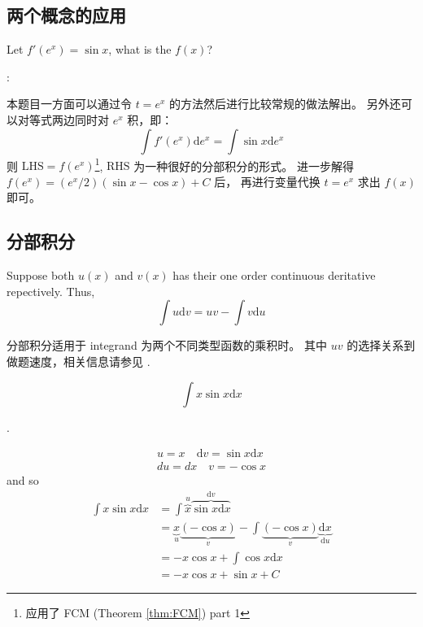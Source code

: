 \subsection{两个概念的应用}

\begin{example}
    Let $f'(e^x) = \sin x$, what is the $f(x)$?

    \cite[page 101, example 1]{we}:

    本题目一方面可以通过令 $t = e^x$ 的方法然后进行比较常规的做法解出。
    另外还可以对等式两边同时对 $e^x$ 积，即：
    \[
        \int f'(e^x) \mbox{d} e^x = \int \sin x \mbox{d} e^x
    \]
    则 $\mbox{LHS} = f(e^x)$\footnote{应用了 FCM (Theorem \ref{thm:FCM}) part 1}, 
    $\mbox{RHS}$ 为一种很好的分部积分的形式。
    进一步解得 $f(e^x) = (e^x/2) (\sin x - \cos x) + C$ 后，
    再进行变量代换 $t = e^x$ 求出 $f(x)$ 即可。
\end{example}

\subsection{分部积分}\label{part-integral}

\begin{definition}
    Suppose both $u(x)$ and $v(x)$ has their one order continuous deritative repectively.
    Thus, 
    \[
        \int u \mbox{d} v = uv - \int v \mbox{d} u
    \]
\end{definition}

分部积分适用于 integrand 为两个不同类型函数的乘积时。
其中 $uv$ 的选择关系到做题速度，相关信息请参见 \cite[page 95, pdf 106]{we}.

\begin{example}
    \[
        \int x \sin x \mathrm dx
    \]

    \cite[page 486]{stewart}.

    \begin{gather*}
        u = x\quad \mathrm dv = \sin x \mathrm dx \\
        du = dx \quad v = -\cos x
    \end{gather*}
    and so
    \begin{align*}
        \int x \sin x \mathrm dx &= \int \overbrace{x}^{u} \overbrace{\sin x \mathrm dx}^{\mathrm dv} \\
                                 &= \underbrace{x}_{u}\underbrace{(-\cos x)}_{v} - \int \underbrace{(-\cos x)}_{v}  \underbrace{\mathrm dx}_{\mathrm du} \\
                                 &= -x \cos x + \int \cos x \mathrm dx \\
                                 &= -x \cos x + \sin x + C
    \end{align*}
\end{example}

